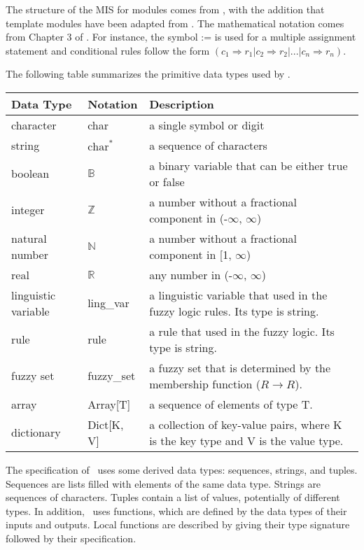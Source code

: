 \documentclass[12pt, titlepage]{article}
\begin{document}

The structure of the MIS for modules comes from \citet{HoffmanAndStrooper1995},
with the addition that template modules have been adapted from
\cite{GhezziEtAl2003}.  The mathematical notation comes from Chapter 3 of
\citet{HoffmanAndStrooper1995}.  For instance, the symbol := is used for a
multiple assignment statement and conditional rules follow the form $(c_1
\Rightarrow r_1 | c_2 \Rightarrow r_2 | ... | c_n \Rightarrow r_n )$.

The following table summarizes the primitive data types used by \progname. 

\begin{center}
\renewcommand{\arraystretch}{1.2}
\noindent 
\begin{tabular}{l l p{7.5cm}} 
\toprule 
\textbf{Data Type} & \textbf{Notation} & \textbf{Description}\\ 
\midrule
character & char & a single symbol or digit\\
string & $\text{char}^*$ & a sequence of characters\\
boolean & $\mathbb{B}$ & a binary variable that can be either true or false\\
integer & $\mathbb{Z}$ & a number without a fractional component in (-$\infty$, $\infty$) \\
natural number & $\mathbb{N}$ & a number without a fractional component in [1, $\infty$) \\
real & $\mathbb{R}$ & any number in (-$\infty$, $\infty$)\\
linguistic variable & ling\_var & a linguistic variable that used in the fuzzy logic rules. 
                               Its type is string.\\
rule & rule & a rule that used in the fuzzy logic. Its type is string.\\
fuzzy set & fuzzy\_set & a fuzzy set that is determined by the membership function ($R \rightarrow R$).\\
array & Array[T] & a sequence of elements of type T.\\
dictionary & Dict[K, V] & a collection of key-value pairs, where K is the key type and V is the value type.\\
\bottomrule
\end{tabular} 
\end{center}

\noindent
The specification of \progname \ uses some derived data types: sequences, strings, and
tuples. Sequences are lists filled with elements of the same data type. Strings
are sequences of characters. Tuples contain a list of values, potentially of
different types. In addition, \progname \ uses functions, which
are defined by the data types of their inputs and outputs. Local functions are
described by giving their type signature followed by their specification.
\end{document}
